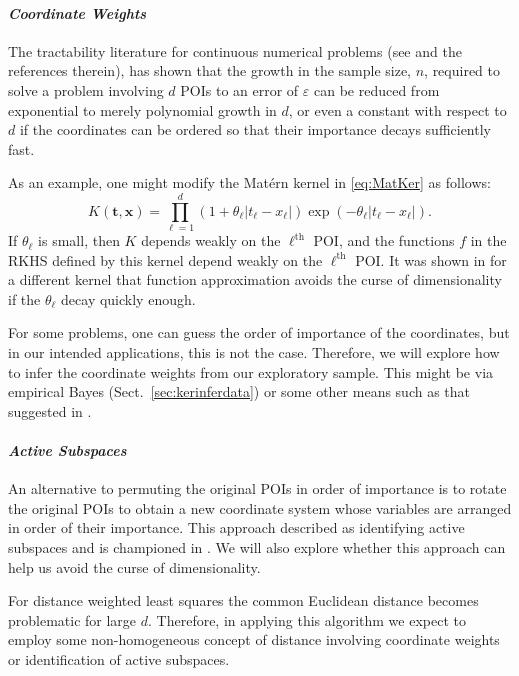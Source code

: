 \documentclass[11pt]{NSFamsart}
\newcommand{\fredparagraph}[1]{\paragraph*{\emph{#1}}}
\newcommand{\bx}{{\boldsymbol{x}}}
\newcommand{\bt}{{\boldsymbol{t}}}
\def\abs#1{\ensuremath{\left \lvert #1 \right \rvert}}
\begin{document}
\fredparagraph{Coordinate Weights}
The tractability literature for continuous numerical problems (see \cite{DicEtal14a,NovWoz08a, NovWoz10a, NovWoz12a} and the references therein), has shown that the growth in the sample size, $n$, required to solve a problem involving $d$ POIs to an error of $\varepsilon$ can be reduced from exponential to merely polynomial growth in $d$, or even a constant with respect to $d$ if the coordinates can be ordered so that their importance decays sufficiently fast.  

As an example, one might modify the Mat\'ern kernel in \eqref{eq:MatKer} as follows:
\begin{equation} \label{eq:MatKer}
    K(\bt,\bx) = \prod_{\ell = 1}^d (1 + \theta_\ell \abs{t_\ell-x_\ell}) \exp(-\theta_\ell \abs{t_\ell-x_\ell}).
\end{equation}
If $\theta_\ell$ is small, then $K$ depends weakly on the $\ell^{\text{th}}$ POI, and the functions $f$ in the RKHS defined by this kernel depend weakly on the $\ell^{\text{th}}$ POI.  It was shown in \cite{FasHicWoz12b, FasHicWoz12a} for a different kernel that function approximation avoids the curse of dimensionality if the $\theta_\ell$ decay quickly enough.

For some problems, one can guess the order of importance of the coordinates, but in our intended applications, this is not the case.  Therefore, we will explore how to infer the coordinate weights from our exploratory sample.  This might be via empirical Bayes (Sect.\ \ref{sec:kerinferdata}) or some other means such as that suggested in \cite{DinHic20a}.

\fredparagraph{Active Subspaces}
An alternative to permuting the original POIs in order of importance is to rotate the original POIs to obtain a new coordinate system whose variables are arranged in order of their importance.  This approach described as identifying active subspaces and is championed in \cite{constantine2015active}.  We will also explore whether this approach can help us avoid the curse of dimensionality.

For distance weighted least squares the common Euclidean distance becomes problematic for large $d$.  Therefore, in applying this algorithm we expect to employ some non-homogeneous concept of distance involving coordinate weights or identification of active subspaces.
\end{document}
